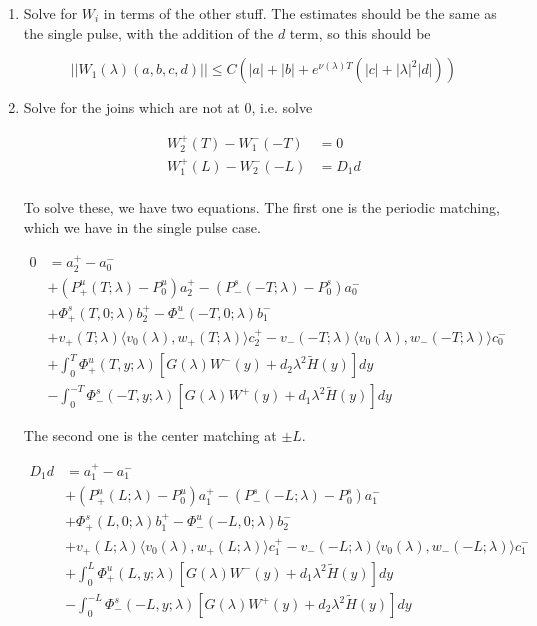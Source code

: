 \documentclass[12pt]{article}
\begin{document}
\begin{enumerate}

\item Solve for $W_i$ in terms of the other stuff. The estimates should be the same as the single pulse, with the addition of the $d$ term, so this should be

\[
||W_1(\lambda)(a,b,c,d)|| \leq C (|a| + |b| + e^{\nu(\lambda)T}(|c| + |\lambda|^2 |d| ))
\]

\item Solve for the joins which are not at 0, i.e. solve

\begin{align*}
W_2^+(T) - W_1^-(-T) &= 0 \\
W_1^+(L) - W_2^-(-L) &= D_1 d \\
\end{align*}

To solve these, we have two equations. The first one is the periodic matching, which we have in the single pulse case.

\begin{align*}
0 &= a_2^+ - a_0^- \\
&+ (P^u_+(T; \lambda) - P_0^u)a_2^+ - (P^s_-(-T; \lambda) - P_0^s)a_0^- \\
&+ \Phi^s_+(T, 0; \lambda)b_2^+ - \Phi^u_-(-T, 0; \lambda)b_1^- \\
&+ v_+(T; \lambda) \langle v_0(\lambda), w_+(T; \lambda) \rangle c_2^+ - v_-(-T; \lambda) \langle v_0(\lambda), w_-(-T; \lambda) \rangle c_0^- \\
&+ \int_0^T \Phi^u_+(T, y; \lambda) [ G(\lambda)W^-(y) + d_2 \lambda^2 \tilde{H}(y) ] dy \\
&- \int_0^{-T} \Phi^s_-(-T, y; \lambda) [ G(\lambda)W^+(y) + d_1 \lambda^2 \tilde{H}(y) ] dy
\end{align*}

The second one is the center matching at $\pm L$.

\begin{align*}
D_1 d &= a_1^+ - a_1^- \\
&+ (P^u_+(L; \lambda) - P_0^u)a_1^+ - (P^s_-(-L; \lambda) - P_0^s)a_1^- \\
&+ \Phi^s_+(L, 0; \lambda)b_1^+ - \Phi^u_-(-L, 0; \lambda)b_2^- \\
&+ v_+(L; \lambda) \langle v_0(\lambda), w_+(L; \lambda) \rangle c_1^+ - v_-(-L; \lambda) \langle v_0(\lambda), w_-(-L; \lambda) \rangle c_1^- \\
&+ \int_0^{L} \Phi^u_+(L, y; \lambda) [ G(\lambda)W^-(y) + d_1 \lambda^2 \tilde{H}(y) ] dy \\
&- \int_0^{-L} \Phi^s_-(-L, y; \lambda) [ G(\lambda)W^+(y) + d_2 \lambda^2 \tilde{H}(y) ] dy
\end{align*}


\end{enumerate}
\end{document}
